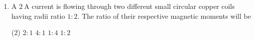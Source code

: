 \begin{enumerate}[leftmargin=*]
\item[$\Omega.$] A $2 \ \mathrm{A}$ current is flowing through two different small circular copper coils having radii ratio $1 : 2$. The ratio of their respective magnetic moments will be
\begin{tasks}(2)
    \task $2 : 1$
    \task $4 : 1$
    \task $1 : 4$ 
    \task $1 : 2$
\end{tasks}
\end{enumerate}
